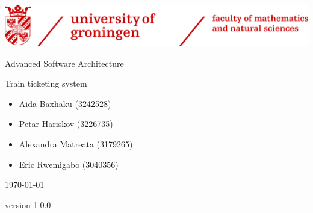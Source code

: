 \begin{titlepage}
	
    \centering
    \includegraphics[scale = 0.115]{Pictures/logo.jpg}\\[1.7 cm]	%
    {\Huge Advanced Software Architecture \par}
    \vspace{1cm}
    {\Large Train ticketing system}

    \vfill
    \justifying
    {\large \begin{itemize}[label={}]
        \item Aida Baxhaku (3242528)
        \item Petar Hariskov (3226735)
        \item Alexandra Matreata (3179265)
        \item Eric Rwemigabo (3040356)
    \end{itemize}}
    
    \vspace{2cm}
    \centering
    {\Large \today \par}
    \vspace{0.1cm}
    {\large version 1.0.0}
\end{titlepage}